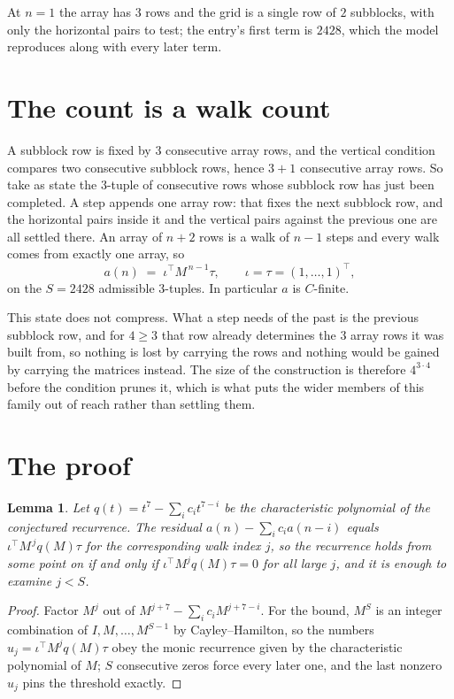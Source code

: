 \documentclass[11pt,a4paper]{article}
\theoremstyle{plain}
\newtheorem{lemma}[theorem]{Lemma}
\theoremstyle{definition}
\begin{document}
At $n=1$ the array has $3$ rows and the grid is a single row of $2$
subblocks, with only the horizontal pairs to test; the entry's first term is
$2428$, which the model reproduces along with every later term.

\section{The count is a walk count}

A subblock row is fixed by $3$ consecutive array rows, and the vertical condition compares
two consecutive subblock rows, hence $3+1$ consecutive array rows. So take as state the
$3$-tuple of consecutive rows whose subblock row has just been completed. A step appends one
array row: that fixes the next subblock row, and the horizontal pairs inside it and the
vertical pairs against the previous one are all settled there. An array of $n+2$ rows is
a walk of $n-1$ steps and every walk comes from exactly one array, so
\[
a(n)\;=\;\iota^{\!\top}M^{\,n-1}\tau,\qquad\iota=\tau=(1,\dots,1)^{\!\top},
\]
on the $S=2428$ admissible $3$-tuples. In particular $a$ is $C$-finite.

This state does not compress. What a step needs of the past is the previous subblock row, and
for $4\ge3$ that row already determines the $3$ array rows it was built from, so nothing
is lost by carrying the rows and nothing would be gained by carrying the matrices instead. The
size of the construction is therefore $4^{3\cdot4}$ before the condition prunes
it, which is what puts the wider members of this family out of reach rather than settling them.

\section{The proof}

\begin{lemma}\label{lem:crit}
Let $q(t)=t^{7}-\sum_i c_it^{7-i}$ be the characteristic polynomial of the
conjectured recurrence. The residual $a(n)-\sum_ic_ia(n-i)$ equals
$\iota^{\!\top}M^{\,j}q(M)\tau$ for the corresponding walk index $j$, so the recurrence
holds from some point on if and only if $\iota^{\!\top}M^{j}q(M)\tau=0$ for all large $j$,
and it is enough to examine $j<S$.
\end{lemma}

\begin{proof}
Factor $M^{j}$ out of $M^{j+7}-\sum_ic_iM^{j+7-i}$. For the bound, $M^{S}$
is an integer combination of $I,M,\dots,M^{S-1}$ by Cayley--Hamilton, so the numbers
$u_j=\iota^{\!\top}M^{j}q(M)\tau$ obey the monic recurrence given by the characteristic
polynomial of $M$; $S$ consecutive zeros force every later one, and the last nonzero $u_j$
pins the threshold exactly.
\end{proof}
\end{document}
